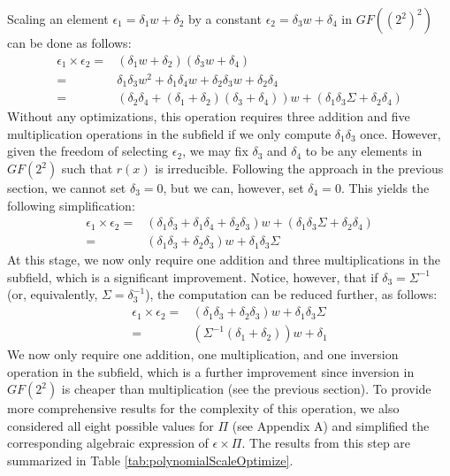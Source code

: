 Scaling an element $\epsilon_1 = \delta_1 w + \delta_2$ by a constant $\epsilon_2 = \delta_3 w + \delta_4$ in $GF((2^2)^2)$ can be done as follows:
\begin{align*}
\epsilon_1 \times \epsilon_2 = & (\delta_1 w + \delta_2)(\delta_3 w + \delta_4) \\
= & \delta_1\delta_3 w^2 + \delta_1\delta_4 w + \delta_2\delta_3 w + \delta_2\delta_4 \\
= & (\delta_2\delta_4 + (\delta_1 + \delta_2)(\delta_3 + \delta_4)) w + (\delta_1\delta_3\Sigma + \delta_2\delta_4)
\end{align*}
Without any optimizations, this operation requires three addition and five multiplication operations in the subfield if we only compute $\delta_1\delta_3$ once. However, given the freedom of selecting $\epsilon_2$, we may fix $\delta_3$ and $\delta_4$ to be any elements in $GF(2^2)$ such that $r(x)$ is irreducible. Following the approach in the previous section, we cannot set $\delta_3 = 0$, but we can, however, set $\delta_4 = 0$. This yields the following simplification:
\begin{align*}
\epsilon_1 \times \epsilon_2 = & (\delta_1\delta_3 + \delta_1\delta_4 + \delta_2\delta_3) w + (\delta_1\delta_3\Sigma + \delta_2\delta_4) \\
= & (\delta_1\delta_3 + \delta_2\delta_3)w + \delta_1\delta_3\Sigma
\end{align*}
At this stage, we now only require one addition and three multiplications in the subfield, which is a significant improvement. Notice, however, that if $\delta_3 = \Sigma^{-1}$ (or, equivalently, $\Sigma = \delta_3^{-1}$), the computation can be reduced further, as follows:
\begin{align*}
\epsilon_1 \times \epsilon_2 = & (\delta_1\delta_3 + \delta_2\delta_3)w + \delta_1\delta_3\Sigma \\
= & (\Sigma^{-1}(\delta_1 + \delta_2))w + \delta_1
\end{align*}
We now only require one addition, one multiplication, and one inversion operation in the subfield, which is a further improvement since inversion in $GF(2^2)$ is cheaper than multiplication (see the previous section). To provide more comprehensive results for the complexity of this operation, we also considered all eight possible values for $\Pi$ (see Appendix A) and simplified the corresponding algebraic expression of $\epsilon \times \Pi$. The results from this step are summarized in Table \ref{tab:polynomialScaleOptimize}.

